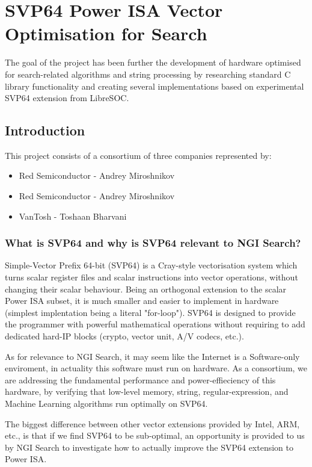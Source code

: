 \chapter{SVP64 Power ISA Vector Optimisation for Search}

The goal of the project has been further the development of hardware
optimised for search-related algorithms and string processing by
researching standard C library functionality and creating several
implementations based on experimental SVP64 extension from LibreSOC.

\section{Introduction}

This project consists of a consortium of three companies represented by:

\begin{itemize}
  \item Red Semiconductor - Andrey Miroshnikov
  \item Red Semiconductor - Andrey Miroshnikov
  \item VanTosh - Toshaan Bharvani
\end{itemize}

\subsection{What is SVP64 and why is SVP64 relevant to NGI Search?}

Simple-Vector Prefix 64-bit (SVP64) is a Cray-style vectorisation system which
turns scalar register files and scalar instructions into vector operations,
without changing their scalar behaviour. Being an orthogonal extension to the
scalar Power ISA subset, it is much smaller and easier to implement in
hardware (simplest implentation being a literal "for-loop"). SVP64 is
designed to provide the programmer with powerful mathematical operations
without requiring to add dedicated hard-IP blocks (crypto, vector unit, A/V
codecs, etc.).

As for relevance to NGI Search, it may seem like the Internet is a
Software-only enviroment, in actuality this software must run on hardware.
As a consortium, we are addressing the fundamental performance and
power-effieciency of this hardware, by verifying that low-level memory,
string, regular-expression, and Machine Learning algorithms run optimally
on SVP64.

The biggest difference between other vector extensions provided by Intel,
ARM, etc., is that if we find SVP64 to be sub-optimal, an opportunity is
provided to us by NGI Search to investigate how to actually improve the
SVP64 extension to Power ISA.

